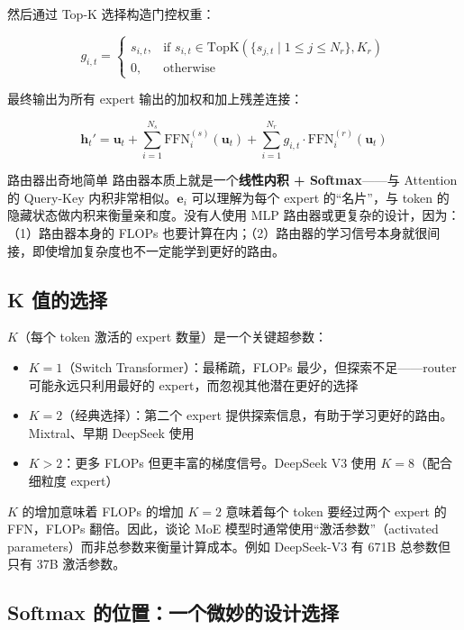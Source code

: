 \documentclass[a4paper]{article}
\begin{document}
然后通过 Top-K 选择构造门控权重：

$$g_{i,t} = \begin{cases} s_{i,t}, & \text{if } s_{i,t} \in \text{TopK}(\{s_{j,t} \mid 1 \leq j \leq N_r\}, K_r) \\ 0, & \text{otherwise} \end{cases}$$

最终输出为所有 expert 输出的加权和加上残差连接：

$$\mathbf{h}_t' = \mathbf{u}_t + \sum_{i=1}^{N_s} \text{FFN}_i^{(s)}(\mathbf{u}_t) + \sum_{i=1}^{N_r} g_{i,t} \cdot \text{FFN}_i^{(r)}(\mathbf{u}_t)$$

\begin{knowledgebox}{路由器出奇地简单}
路由器本质上就是一个\textbf{线性内积 + Softmax}——与 Attention 的 Query-Key 内积非常相似。$\mathbf{e}_i$ 可以理解为每个 expert 的``名片''，与 token 的隐藏状态做内积来衡量亲和度。没有人使用 MLP 路由器或更复杂的设计，因为：（1）路由器本身的 FLOPs 也要计算在内；（2）路由器的学习信号本身就很间接，即使增加复杂度也不一定能学到更好的路由。
\end{knowledgebox}

\subsection{K 值的选择}

$K$（每个 token 激活的 expert 数量）是一个关键超参数：

\begin{itemize}
    \item \textbf{$K = 1$}（Switch Transformer）：最稀疏，FLOPs 最少，但探索不足——router 可能永远只利用最好的 expert，而忽视其他潜在更好的选择
    \item \textbf{$K = 2$}（经典选择）：第二个 expert 提供探索信息，有助于学习更好的路由。Mixtral、早期 DeepSeek 使用
    \item \textbf{$K > 2$}：更多 FLOPs 但更丰富的梯度信号。DeepSeek V3 使用 $K = 8$（配合细粒度 expert）
\end{itemize}

\begin{warningbox}{$K$ 的增加意味着 FLOPs 的增加}
$K = 2$ 意味着每个 token 要经过两个 expert 的 FFN，FLOPs 翻倍。因此，谈论 MoE 模型时通常使用``激活参数''（activated parameters）而非总参数来衡量计算成本。例如 DeepSeek-V3 有 671B 总参数但只有 37B 激活参数。
\end{warningbox}

\subsection{Softmax 的位置：一个微妙的设计选择}
\end{document}
